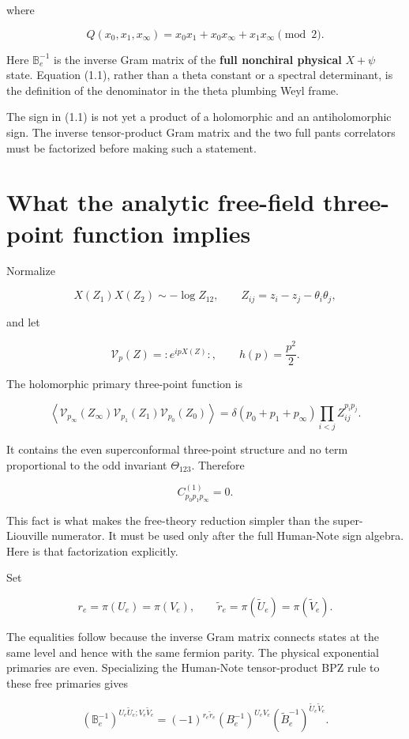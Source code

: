 \documentclass[11pt]{article}
\begin{document}
where

\[
 Q(x_0,x_1,x_\infty)
 =x_0x_1+x_0x_\infty+x_1x_\infty\pmod2.
\tag{1.2}
\]

Here \(\mathbb B_e^{-1}\) is the inverse Gram matrix of the \textbf{full
nonchiral physical} \(X+\psi\) state.  Equation (1.1), rather than a theta
constant or a spectral determinant, is the definition of the denominator in
the theta plumbing Weyl frame.

The sign in (1.1) is not yet a product of a holomorphic and an
antiholomorphic sign.  The inverse tensor-product Gram matrix and the two
full pants correlators must be factorized before making such a statement.

\section{What the analytic free-field three-point function implies}

Normalize

\[
 X(Z_1)X(Z_2)\sim-\log Z_{12},\qquad
 Z_{ij}=z_i-z_j-\theta_i\theta_j,
\]

and let

\[
 \mathcal V_p(Z)=:e^{ipX(Z)}:,
 \qquad h(p)=\frac{p^2}{2}.
\]

The holomorphic primary three-point function is

\[
 \left\langle
 \mathcal V_{p_\infty}(Z_\infty)
 \mathcal V_{p_1}(Z_1)
 \mathcal V_{p_0}(Z_0)
 \right\rangle
 =\delta(p_0+p_1+p_\infty)
  \prod_{i<j}Z_{ij}^{p_ip_j}.
\tag{2.1}
\]

It contains the even superconformal three-point structure and no term
proportional to the odd invariant \(\Theta_{123}\).  Therefore

\[
 C^{(1)}_{p_0p_1p_\infty}=0.
\tag{2.2}
\]

This fact is what makes the free-theory reduction simpler than the
super-Liouville numerator.  It must be used only after the full Human-Note
sign algebra.  Here is that factorization explicitly.

Set

\[
 r_e=\pi(U_e)=\pi(V_e),
 \qquad
 \widetilde r_e=\pi(\widetilde U_e)=\pi(\widetilde V_e).
\]

The equalities follow because the inverse Gram matrix connects states at the
same level and hence with the same fermion parity.  The physical exponential
primaries are even.  Specializing the Human-Note tensor-product BPZ rule to
these free primaries gives

\[
 \left(\mathbb B_e^{-1}\right)^{
 U_e\widetilde U_e;V_e\widetilde V_e}
 =(-1)^{r_e\widetilde r_e}
  \left(B_e^{-1}\right)^{U_eV_e}
  \left(\widetilde B_e^{-1}\right)^{
    \widetilde U_e\widetilde V_e}.
\tag{2.2a}
\]
\end{document}
